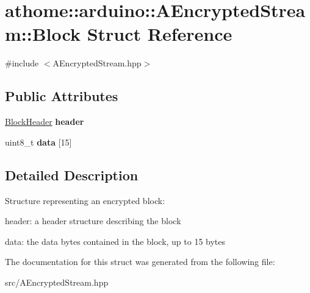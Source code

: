\hypertarget{structathome_1_1arduino_1_1_a_encrypted_stream_1_1_block}{}\section{athome\+:\+:arduino\+:\+:A\+Encrypted\+Stream\+:\+:Block Struct Reference}
\label{structathome_1_1arduino_1_1_a_encrypted_stream_1_1_block}


{\ttfamily \#include $<$A\+Encrypted\+Stream.\+hpp$>$}

\subsection*{Public Attributes}
\begin{DoxyCompactItemize}
\item 
\mbox{\label{structathome_1_1arduino_1_1_a_encrypted_stream_1_1_block_a3dfd02b9f425681b70d73fe576cd9137}} 
\mbox{\hyperlink{structathome_1_1arduino_1_1_a_encrypted_stream_1_1_block_header}{Block\+Header}} {\bfseries header}
\item 
\mbox{\label{structathome_1_1arduino_1_1_a_encrypted_stream_1_1_block_aa6f9b969e07f50138314351f15d2dc50}} 
uint8\+\_\+t {\bfseries data} \mbox{[}15\mbox{]}
\end{DoxyCompactItemize}


\subsection{Detailed Description}
Structure representing an encrypted block\+:


\begin{DoxyItemize}
\item header\+: a header structure describing the block
\item data\+: the data bytes contained in the block, up to 15 bytes 
\end{DoxyItemize}

The documentation for this struct was generated from the following file\+:\begin{DoxyCompactItemize}
\item 
src/A\+Encrypted\+Stream.\+hpp\end{DoxyCompactItemize}
